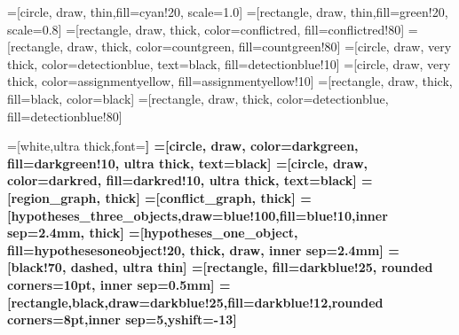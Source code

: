 =[circle, draw, thin,fill=cyan!20, scale=1.0]
=[rectangle, draw, thin,fill=green!20, scale=0.8]
=[rectangle, draw, thick, color=conflictred, fill=conflictred!80]
=[rectangle, draw, thick, color=countgreen, fill=countgreen!80]
=[circle, draw, very thick, color=detectionblue, text=black, fill=detectionblue!10]
=[circle, draw, very thick, color=assignmentyellow, fill=assignmentyellow!10]
=[rectangle, draw, thick, fill=black, color=black]
=[rectangle, draw, thick, color=detectionblue, fill=detectionblue!80]


=[white,ultra thick,font=\bfseries]
=[circle, draw, color=darkgreen, fill=darkgreen!10, ultra thick, text=black]
=[circle, draw, color=darkred, fill=darkred!10, ultra thick, text=black]
=[region_graph, thick]
=[conflict_graph, thick]
=[hypotheses_three_objects,draw=blue!100,fill=blue!10,inner sep=2.4mm, thick]
=[hypotheses_one_object, fill=hypothesesoneobject!20, thick, draw, inner
sep=2.4mm]
=[black!70, dashed, ultra thin]
=[rectangle, fill=darkblue!25, rounded corners=10pt, inner sep=0.5mm]
=[rectangle,black,draw=darkblue!25,fill=darkblue!12,rounded corners=8pt,inner
sep=5,yshift=-13]

